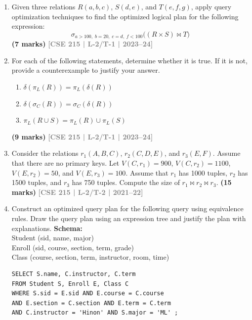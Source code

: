 \documentclass[12pt]{article}
\newcommand{\yr}[1]{\hfill\textcolor{gray}{\small\textbf{[#1]}}}
\newcommand{\mk}[1]{\textcolor{orange!70!black}{\small\textbf{(#1 marks)}}}
\begin{document}
\begin{enumerate}

\item Given three relations $R(a, b, c)$, $S(d, e)$, and $T(e, f, g)$, apply query optimization techniques to find the optimized logical plan for the following expression:
\[\sigma_{a>100,\; b=20,\; c=d,\; f<100}\bigl((R \times S) \bowtie T\bigr)\]
\mk{7} \yr{CSE 215 | L-2/T-1 | 2023--24}


\item For each of the following statements, determine whether it is true. If it is not, provide a counterexample to justify your answer.
\begin{enumerate}
  \item $\delta(\pi_L(R)) = \pi_L(\delta(R))$
  \item $\delta(\sigma_C(R)) = \sigma_C(\delta(R))$
  \item $\pi_L(R \cup S) = \pi_L(R) \cup \pi_L(S)$
\end{enumerate}
\mk{9} \yr{CSE 215 | L-2/T-1 | 2023--24}


\item Consider the relations $r_1(A, B, C)$, $r_2(C, D, E)$, and $r_3(E, F)$. Assume that there are no primary keys. Let $V(C, r_1) = 900$, $V(C, r_2) = 1100$, $V(E, r_2) = 50$, and $V(E, r_3) = 100$. Assume that $r_1$ has 1000 tuples, $r_2$ has 1500 tuples, and $r_3$ has 750 tuples. Compute the size of $r_1 \bowtie r_2 \bowtie r_3$.
\mk{15} \yr{CSE 215 | L-2/T-2 | 2021--22}


\item Construct an optimized query plan for the following query using equivalence rules. Draw the query plan using an expression tree and justify the plan with explanations.
\vspace{0.2cm}
\textbf{Schema:} \\
Student (sid, name, major) \\
Enroll (sid, course, section, term, grade) \\
Class (course, section, term, instructor, room, time)

\vspace{0.2cm}
 
\vspace{0.2cm}

\begin{lstlisting}
SELECT S.name, C.instructor, C.term
FROM Student S, Enroll E, Class C
WHERE S.sid = E.sid AND E.course = C.course
AND E.section = C.section AND E.term = C.term
AND C.instructor = 'Hinon' AND S.major = 'ML' ;
\end{lstlisting}


\end{enumerate}
\end{document}
